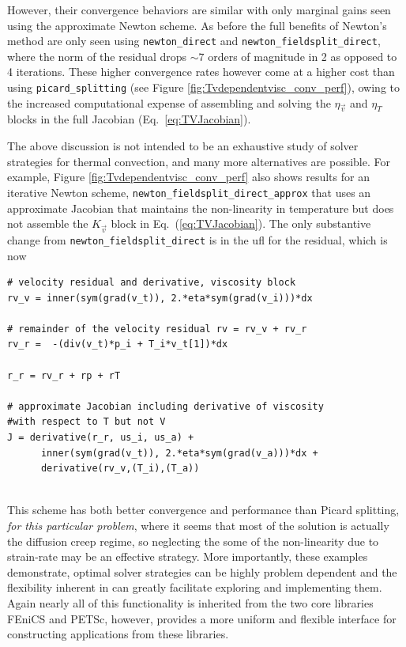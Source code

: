 However, their convergence behaviors are similar with only
marginal gains seen using the approximate Newton scheme.  As before
the full benefits of Newton's method are only seen
using \texttt{newton\_direct} and \texttt{newton\_fieldsplit\_direct},
where the norm of the residual drops $\sim 7$ orders of magnitude in 2
as opposed to 4 iterations.  These higher
convergence rates however come at a higher cost than using
\texttt{picard\_splitting} (see Figure
\ref{fig:Tvdependentvisc_conv_perf}), owing to the increased
computational expense  of assembling and solving the $\eta_{\vec{v}}$
and $\eta_{T}$ blocks in the full Jacobian (Eq.\ \ref{eq:TVJacobian}). 

The above discussion is not intended to be an exhaustive study of
solver strategies for thermal convection, and many more alternatives
are possible.  For example, Figure
\ref{fig:Tvdependentvisc_conv_perf} also shows results for an iterative
Newton scheme, \texttt{newton\_fieldsplit\_direct\_approx} that uses an approximate Jacobian   that maintains the
non-linearity in temperature but does not assemble the
$K_{\vec{v}}$ block in Eq.\ (\ref{eq:TVJacobian}). The only
substantive change from \texttt{newton\_fieldsplit\_direct} is in the
ufl for the residual, which is now
\pagebreak{}
\begin{lstlisting}[style=ufl]
# velocity residual and derivative, viscosity block
rv_v = inner(sym(grad(v_t)), 2.*eta*sym(grad(v_i)))*dx

# remainder of the velocity residual rv = rv_v + rv_r
rv_r =  -(div(v_t)*p_i + T_i*v_t[1])*dx

r_r = rv_r + rp + rT

# approximate Jacobian including derivative of viscosity 
#with respect to T but not V
J = derivative(r_r, us_i, us_a) + 
      inner(sym(grad(v_t)), 2.*eta*sym(grad(v_a)))*dx + 
      derivative(rv_v,(T_i),(T_a))
  
\end{lstlisting}
This scheme has both better convergence and performance than Picard
splitting, \emph{for this particular problem}, where it seems that
most of the solution is actually the diffusion creep regime, so
neglecting the some of the non-linearity due to strain-rate may be an
effective strategy.  More importantly,  these
examples demonstrate, optimal solver strategies can be highly problem
dependent and the flexibility inherent in \TF{} can greatly
facilitate exploring and implementing them.  Again nearly all of this
functionality is inherited from the two core libraries FEniCS and
PETSc, however, \TF{} provides a more uniform and flexible interface
for constructing applications from these libraries.
 


